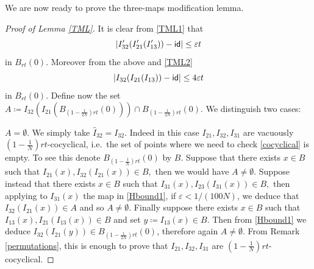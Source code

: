 \documentclass[11pt]{article}
\newcommand{\eps}{\varepsilon}
\theoremstyle{plain}
\theoremstyle{definition}
\numberwithin{equation}{section}
\begin{document}
We are now ready to prove the three-maps modification lemma.
\begin{proof}[Proof of Lemma \ref{TML}]
	It is clear from \eqref{TML1} that
	\begin{equation*}
		| I_{32}'( I_{21}'(I_{13}'))-{\sf{id}}|\le\eps t 
	\end{equation*}	
	in $B_{rt}(0)$. Moreover from the above and \eqref{TML2}
	\begin{equation}\label{Hbound1}
		| I_{32}(I_{21}(I_{13}))-{\sf{id}}|\le4\eps t 
	\end{equation}
	in $B_{rt}(0)$. 
	Define now the set $A\coloneqq I_{32}(I_{21}(B_{(1-\frac{1}{2N})rt}(0)))\cap B_{(1-\frac{1}{2N})rt}(0).$ We distinguish two cases:
	
	 $A=\emptyset$. We simply take $\hat I_{32}=I_{32}.$ Indeed in this case $I_{21},I_{32},I_{31}$ are vacuously  $(1-\frac{1}{N})rt$-cocyclical, i.e.\ the set of points where we need to check \eqref{cocyclical} is empty. To see this denote $B_{(1-\frac{1}{N})rt}(0)$ by $B$. Suppose that there exists $x \in B$ such that $I_{21}(x),I_{32}(I_{21}(x))\in B, $ then we would have $A\neq \emptyset.$ Suppose  instead that there exists $x \in B$ such that $I_{31}(x),I_{23}(I_{31}(x))\in B, $ then applying to $I_{31}(x)$ the map in \eqref{Hbound1}, if  $\eps<1/(100N)$, we deduce  that $I_{32}(I_{21}(x))\in A$ and so $A\neq \emptyset.$ Finally suppose there exists $x \in B$ such that $I_{13}(x),I_{21}(I_{13}(x))\in B $ and set $y\coloneqq I_{13}(x)\in B.$ Then from \eqref{Hbound1}  we deduce $I_{32}(I_{21}(y)) \in B_{(1-\frac{1}{2N})rt}(0)$, therefore again $A\neq \emptyset.$ From Remark \ref{permutations}, this is enough to prove that $I_{21},I_{32},I_{31}$ are $(1-\frac{1}{N})rt$-cocyclical.
	

\end{proof}
\end{document}
